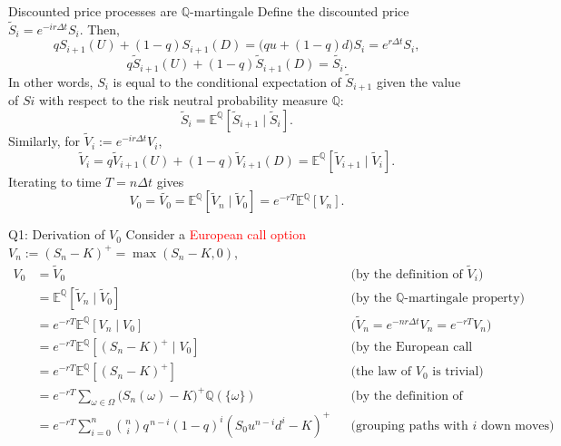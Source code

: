 \documentclass{beamer}
\newcommand{\bQ}{\mathbb{Q}}
\begin{document}
\begin{frame}{Discounted price processes are $\mathbb{Q}$-martingale}
Define the discounted price $\widetilde{S}_i = e^{-ir\Delta t} S_i$.
Then,
\[
qS_{i+1}(U) + (1-q) S_{i+1}(D) = \big(qu +(1-q)d\big)S_i = e^{r\Delta t} S_i,
\]
\[
q\widetilde{S}_{i+1}(U) + (1-q)\widetilde{S}_{i+1}(D) = \widetilde{S_i}.
\]
In other words, $S_i$ is equal to the conditional expectation of $\widetilde{S}_{i+1}$ given
the value of 
\(Si\) with respect to the risk neutral probability measure \(\mathbb{Q}\):
\[
\widetilde{S}_{i} = \mathbb{E}^{\mathbb{Q}}[\widetilde{S}_{i+1} \mid \widetilde{S}_{i}].
\]
Similarly, for $\widetilde{V}_i := e^{-ir\Delta t} V_i$,
\[
\widetilde{V}_{i} = q\widetilde{V}_{i+1}(U) + (1-q)\widetilde{V}_{i+1}(D)= \mathbb{E}^{\mathbb{Q}}[\widetilde{V}_{i+1} \mid \widetilde{V}_{i}]
.\]
Iterating to time $T = n\Delta t$ gives
\[V_0 = \widetilde{V_0} =\mathbb{E}^{\mathbb{Q}}[\widetilde{V}_{n} \mid \widetilde{V}_{0}] =e^{-rT} \mathbb{E}^\mathbb{Q}[{V}_{n}].\]
\end{frame}

\begin{frame}{Q1: Derivation of $V_0$}
\footnotesize
Consider a \textcolor{red}{European call option} $V_n := (S_n - K)^+ = \max(S_n - K, 0)$,
\begin{align*}
V_0
&= \widetilde{V}_0
&&\text{(by the definition of \(\widetilde{V}_i\))}\\
&= \mathbb{E}^{\mathbb{Q}}
   \left[\widetilde{V}_n\mid \widetilde{V}_0\right]
&&\text{(by the $\bQ$-martingale property)}\\
&= e^{-rT}\mathbb{E}^{\mathbb{Q}}
   \left[V_n\mid V_0\right]
&&\text{(\(\widetilde{V}_n=e^{-nr\Delta t}V_n=e^{-rT}V_n\))}\\
&= e^{-rT}\mathbb{E}^{\mathbb{Q}}
   \left[(S_n-K)^+\mid V_0\right]
&&\text{(by the European call payoff)}\\
&= e^{-rT}\mathbb{E}^{\mathbb{Q}}
   \left[(S_n-K)^+\right]
&&\text{(the law of \(V_0\) is trivial)}\\
&= e^{-rT}
   \sum_{\omega\in\Omega}
   \bigl(S_n(\omega)-K\bigr)^+
   \mathbb{Q}(\{\omega\})
&&\text{(by the definition of expectation)}\\
&= e^{-rT}
   \sum_{i=0}^{n}
   \binom{n}{i}
   q^{\,n-i}(1-q)^i
   \left(S_0u^{n-i}d^i-K\right)^+
&&\text{(grouping paths with \(i\) down moves)}\\
\end{align*}
\end{frame}
\end{document}
